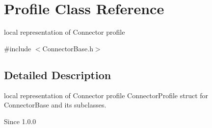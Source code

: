 \section{Profile Class Reference}
\label{classProfile}


local representation of Connector profile  




{\ttfamily \#include $<$ConnectorBase.h$>$}



\subsection{Detailed Description}
local representation of Connector profile ConnectorProfile struct for ConnectorBase and its subclasses.

\begin{DoxySince}{Since}
1.0.0 
\end{DoxySince}
